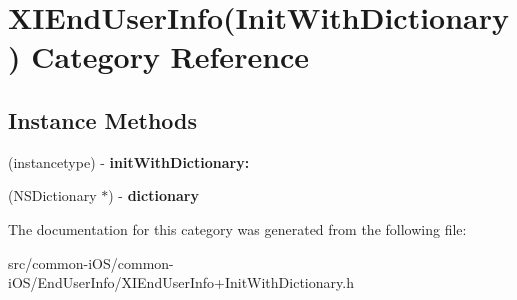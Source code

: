 \hypertarget{category_x_i_end_user_info_07_init_with_dictionary_08}{}\section{X\+I\+End\+User\+Info(Init\+With\+Dictionary) Category Reference}
\label{category_x_i_end_user_info_07_init_with_dictionary_08}
\subsection*{Instance Methods}
\begin{DoxyCompactItemize}
\item 
\hypertarget{category_x_i_end_user_info_07_init_with_dictionary_08_abfca85fbd7a78022ee82a3f9bbade3bb}{}\label{category_x_i_end_user_info_07_init_with_dictionary_08_abfca85fbd7a78022ee82a3f9bbade3bb} 
(instancetype) -\/ {\bfseries init\+With\+Dictionary\+:}
\item 
\hypertarget{category_x_i_end_user_info_07_init_with_dictionary_08_a2cf8fe403d497eda4cacb42041954a93}{}\label{category_x_i_end_user_info_07_init_with_dictionary_08_a2cf8fe403d497eda4cacb42041954a93} 
(N\+S\+Dictionary $\ast$) -\/ {\bfseries dictionary}
\end{DoxyCompactItemize}


The documentation for this category was generated from the following file\+:\begin{DoxyCompactItemize}
\item 
src/common-\/i\+O\+S/common-\/i\+O\+S/\+End\+User\+Info/X\+I\+End\+User\+Info+\+Init\+With\+Dictionary.\+h\end{DoxyCompactItemize}
